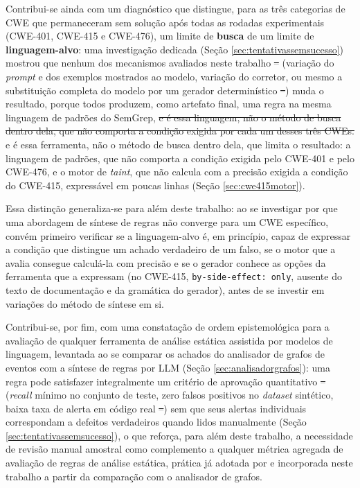 \documentclass[
    12pt,                %
    openright,           %
    oneside,             %
    a4paper,             %
    english,             %
    brazil               %
]{abntex2}
\newcommand{\antigo}[1]{\sout{#1}}
\newcommand{\novo}[1]{{\color{red}#1}}
\begin{document}
\par
Contribui-se ainda com um diagnóstico que distingue, para as três categorias de CWE que permaneceram sem solução após todas as rodadas experimentais (CWE-401, CWE-415 e CWE-476), um limite de \textbf{busca} de um limite de \textbf{linguagem-alvo}: uma investigação dedicada (Seção \ref{sec:tentativassemsucesso}) mostrou que nenhum dos mecanismos avaliados neste trabalho\antigo{ --}\novo{ (}variação do \textit{prompt} e dos exemplos mostrados ao modelo, variação do corretor, ou mesmo a substituição completa do modelo por um gerador determinístico\antigo{ --}\novo{)} muda o resultado, porque todos produzem, como artefato final, uma regra na mesma linguagem de padrões do SemGrep, \antigo{e é essa linguagem, não o método de busca dentro dela, que não comporta a condição exigida por cada um desses três CWEs.} \novo{e é essa ferramenta, não o método de busca dentro dela, que limita o resultado: a linguagem de padrões, que não comporta a condição exigida pelo CWE-401 e pelo CWE-476, e o motor de \textit{taint}, que não calcula com a precisão exigida a condição do CWE-415, expressável em poucas linhas (Seção \ref{sec:cwe415motor}).}
\par
Essa distinção generaliza-se para além deste trabalho: ao se investigar por que uma abordagem de síntese de regras não converge para um CWE específico, convém primeiro verificar se a linguagem-alvo é, em princípio, capaz de expressar a condição que distingue um achado verdadeiro de um falso\novo{, se o motor que a avalia consegue calculá-la com precisão e se o gerador conhece as opções da ferramenta que a expressam (no CWE-415, \texttt{by-side-effect: only}, ausente do texto de documentação e da gramática do gerador),} antes de se investir em variações do método de síntese em si.
\par
Contribui-se, por fim, com uma constatação de ordem epistemológica para a avaliação de qualquer ferramenta de análise estática assistida por modelos de linguagem, levantada ao se comparar os achados do analisador de grafos de eventos com a síntese de regras por LLM (Seção \ref{sec:analisadorgrafos}): uma regra pode satisfazer integralmente um critério de aprovação quantitativo\antigo{ --}\novo{ (}\textit{recall} mínimo no conjunto de teste, zero falsos positivos no \textit{dataset} sintético, baixa taxa de alerta em código real\antigo{ --}\novo{)} sem que seus alertas individuais correspondam a defeitos verdadeiros quando lidos manualmente (Seção \ref{sec:tentativassemsucesso}), o que reforça, para além deste trabalho, a necessidade de revisão manual amostral como complemento a qualquer métrica agregada de avaliação de regras de análise estática, prática já adotada por  e incorporada neste trabalho a partir da comparação com o analisador de grafos.
\end{document}
